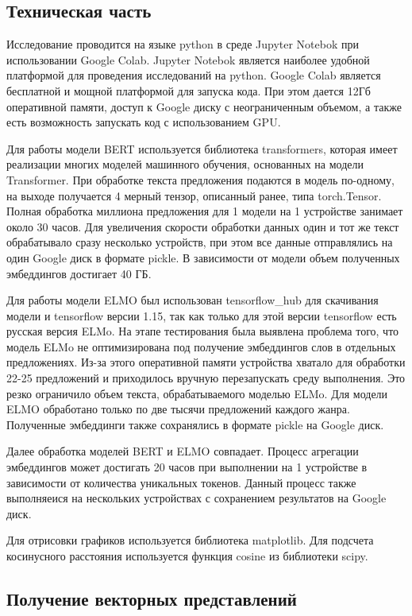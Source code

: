 \documentclass[a4paper,14pt]{article}
\begin{document}
\subsection{Техническая часть}

Исследование проводится на языке python в среде Jupyter Notebok при использовании Google Colab.
Jupyter Notebok является наиболее удобной платформой для проведения исследований на python.
Google Colab является бесплатной и мощной платформой для запуска кода.
При этом дается 12Гб оперативной памяти, доступ к Google диску с неограниченным объемом, а также есть возможность запускать код с использованием GPU.

Для работы модели BERT используется библиотека transformers, которая имеет реализации многих моделей машинного обучения, основанных на модели Transformer.
При обработке текста предложения подаются в модель по-одному, на выходе получается 4 мерный тензор, описанный ранее, типа torch.Tensor.
Полная обработка миллиона предложения для 1 модели на 1 устройстве занимает около 30 часов.
Для увеличения скорости обработки данных один и тот же текст обрабатывало сразу несколько устройств, при этом все данные отправлялись на один Google диск в формате pickle.
В зависимости от модели объем полученных эмбеддингов достигает 40 ГБ.

Для работы модели ELMO был использован tensorflow\_hub для скачивания модели и tensorflow версии 1.15, так как только для этой версии tensorflow есть русская версия ELMo.
На этапе тестирования была выявлена проблема того, что модель ELMo не оптимизирована под получение эмбеддингов слов в отдельных предложениях.
Из-за этого оперативной памяти устройства хватало для обработки 22-25 предложений и приходилось вручную перезапускать среду выполнения.
Это резко ограничило объем текста, обрабатываемого моделью ELMo.
Для модели ELMO обработано только по две тысячи предложений каждого жанра.
Полученные эмбеддинги также сохранялись в формате pickle на Google диск.

Далее обработка моделей BERT и ELMO совпадает.
Процесс агрегации эмбеддингов может достигать 20 часов при выполнении на 1 устройстве в зависимости от количества уникальных токенов.
Данный процесс также выполняеися на нескольких устройствах с сохранением результатов на Google диск.

Для отрисовки графиков используется библиотека matplotlib.
Для подсчета косинусного расстояния используется функция cosine из библиотеки scipy.

\subsection{Получение векторных представлений}
\end{document}
